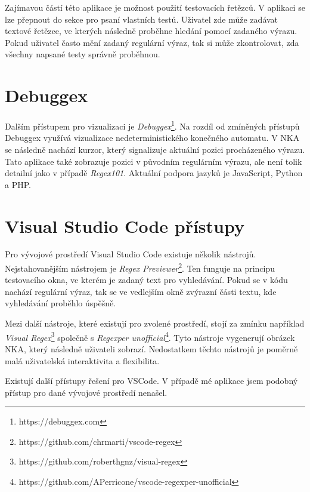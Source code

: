 Zajímavou částí této aplikace je možnost použití testovacích řetězců.
V aplikaci se lze přepnout do sekce pro psaní vlastních testů.
Uživatel zde může zadávat textové řetězce, ve kterých následně proběhne hledání pomocí zadaného výrazu.
Pokud uživatel často mění zadaný regulární výraz, tak si může zkontrolovat, zda všechny napsané testy správně proběhnou.

\section{Debuggex}

Dalším přístupem pro vizualizaci je \textit{Debuggex}\footnote{https://debuggex.com}.
Na rozdíl od zmíněných přístupů Debuggex využívá vizualizace nedeterministického konečného automatu.
V NKA se následně nachází kurzor, který signalizuje aktuální pozici procházeného výrazu.
Tato aplikace také zobrazuje pozici v původním regulárním výrazu, ale není tolik detailní jako v případě \textit{Regex101}.
Aktuální podpora jazyků je JavaScript, Python a PHP.

\section{Visual Studio Code přístupy}

Pro vývojové prostředí Visual Studio Code existuje několik nástrojů.
Nejstahovanějším nástrojem je \textit{Regex Previewer}\footnote{https://github.com/chrmarti/vscode-regex}.
Ten funguje na principu testovacího okna, ve kterém je zadaný text pro vyhledávání.
Pokud se v kódu nachází regulární výraz, tak se ve vedlejším okně zvýrazní části textu, kde vyhledávání proběhlo úspěšně. 

Mezi další nástroje, které existují pro zvolené prostředí, stojí za zmínku například \textit{Visual Regex}\footnote{https://github.com/roberthgnz/visual-regex} společně s \textit{Regexper unofficial}\footnote{https://github.com/APerricone/vscode-regexper-unofficial}.
Tyto nástroje vygenerují obrázek NKA, který následně uživateli zobrazí.
Nedostatkem těchto nástrojů je poměrně malá uživatelská interaktivita a flexibilita.

Existují další přístupy řešení pro VSCode. 
V případě mé aplikace jsem podobný přístup pro dané vývojové prostředí nenašel.